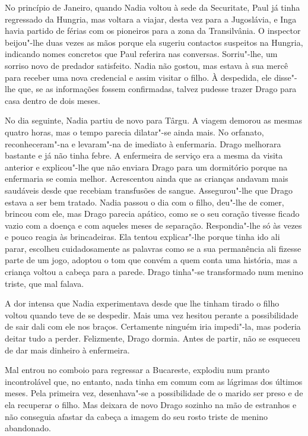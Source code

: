 No princípio de Janeiro, quando Nadia voltou à sede
da Securitate, Paul já tinha regressado da Hungria, mas voltara a
viajar, desta vez para a Jugoslávia, e Inga havia partido de férias com
os pioneiros para a zona da Transilvânia. O inspector beijou"-lhe duas
vezes as mãos porque ela sugeriu contactos suspeitos na Hungria,
indicando
nomes concretos que Paul referira nas conversas. Sorriu"-lhe, um sorriso novo de predador satisfeito. Nadia não gostou, mas
estava à sua mercê para receber uma nova credencial e assim visitar o
filho. À despedida, ele disse"-lhe que, se as informações fossem
confirmadas, talvez pudesse trazer Drago para casa dentro de dois meses.

No dia seguinte, Nadia partiu de novo para Târgu. A viagem demorou as
mesmas quatro horas, mas o tempo parecia dilatar"-se ainda mais. No
orfanato, reconheceram"-na e levaram"-na de imediato à enfermaria. Drago melhorara bastante e
já não tinha febre. A enfermeira de serviço era a mesma da visita
anterior e explicou"-lhe que não enviara Drago para um dormitório porque
na enfermaria se comia melhor. Acrescentou ainda que as crianças andavam mais saudáveis desde que recebiam transfusões de sangue.
Assegurou"-lhe que Drago estava a ser bem tratado. Nadia passou o dia com
o filho, deu"-lhe de comer, brincou com ele, mas Drago parecia apático,
como se o seu coração tivesse ficado vazio com a doença e com aqueles
meses de separação. Respondia"-lhe só às vezes e pouco reagia às
brincadeiras. Ela tentou explicar"-lhe porque tinha ido ali parar,
escolheu cuidadosamente as palavras como se a sua permanência ali
fizesse parte de um jogo, adoptou o tom que convém a quem conta uma
história, mas a criança voltou a cabeça para a parede. Drago tinha"-se
transformado num menino triste, que mal falava.

A dor intensa que Nadia experimentava desde que lhe tinham tirado o
filho voltou quando teve de se despedir. Mais uma vez hesitou perante a
possibilidade de sair dali com ele nos braços. Certamente ninguém iria
impedi"-la,
mas poderia deitar tudo a perder. Felizmente, Drago dormia. Antes de
partir, não se esqueceu de dar mais dinheiro à enfermeira.

Mal entrou no comboio para regressar a Bucareste, explodiu num pranto
incontrolável que, no entanto, nada tinha em comum com as lágrimas dos
últimos meses. Pela primeira vez, desenhava"-se a possibilidade de o
marido ser preso e de ela recuperar o filho. Mas deixara de novo Drago
sozinho na mão de estranhos e não conseguia afastar da cabeça a imagem
do seu rosto triste de menino abandonado.

